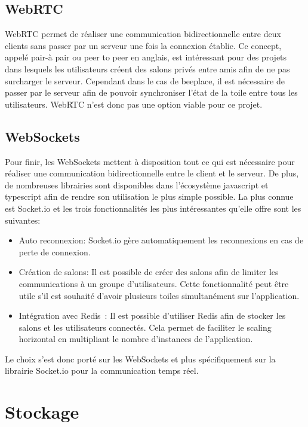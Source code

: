 \subsection{WebRTC}
WebRTC permet de réaliser une communication bidirectionnelle entre deux clients sans passer par un serveur une fois la connexion établie. Ce concept, appelé pair-à pair ou peer to peer en anglais, est intéressant pour des projets dans lesquels les utilisateurs créent des salons privés entre amis afin de ne pas surcharger le serveur. Cependant dans le cas de \gls{beeplace}, il est nécessaire de passer par le serveur afin de pouvoir synchroniser l'état de la toile entre tous les utilisateurs. WebRTC n'est donc pas une option viable pour ce projet.

\subsection{WebSockets}
Pour finir, les WebSockets mettent à disposition tout ce qui est nécessaire pour réaliser une communication bidirectionnelle entre le client et le serveur. De plus, de nombreuses librairies sont disponibles dans l'écosystème \gls{javascript} et \gls{typescript} afin de rendre son utilisation le plus simple possible. La plus connue est Socket.io et les trois fonctionnalités les plus intéressantes qu'elle offre sont les suivantes:

\begin{itemize}
  \item Auto reconnexion: Socket.io gère automatiquement les reconnexions en cas de perte de connexion.
  \item Création de salons: Il est possible de créer des salons afin de limiter les communications à un groupe d'utilisateurs. Cette fonctionnalité peut être utile s'il est souhaité d'avoir plusieurs toiles simultanément sur l'application.
  \item Intégration avec Redis~\cite{redis}: Il est possible d'utiliser Redis afin de stocker les salons et les utilisateurs connectés. Cela permet de faciliter le scaling horizontal en multipliant le nombre d'instances de l'application.
\end{itemize}

Le choix s'est donc porté sur les WebSockets et plus spécifiquement sur la librairie Socket.io pour la communication temps réel.

\section{Stockage}

